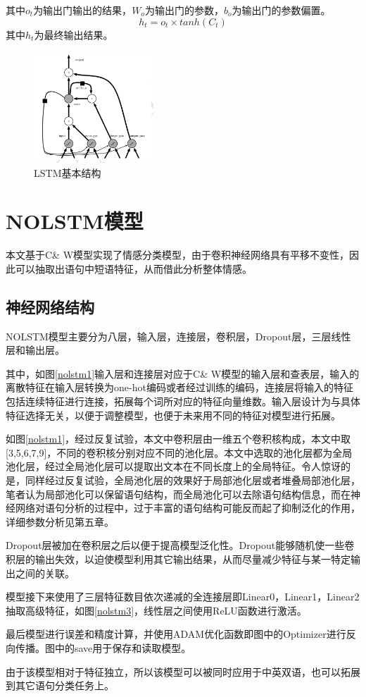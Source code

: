 其中$o_t$为输出门输出的结果，$W_o$为输出门的参数，$b_o$为输出门的参数偏置。
\begin{equation}
h_t = o_t \times tanh{(C_t)}
\end{equation}
其中$h_t$为最终输出结果。
\begin{figure}[!hbp]
\begin{center}
\includegraphics[width=0.4\textwidth]{graphic/lstm1.png}
\caption{LSTM基本结构\cite{deeplearning2016} \label{lstm1}}
\end{center}
\end{figure}

\section{NOLSTM模型}
本文基于C\& W模型实现了情感分类模型，由于卷积神经网络具有平移不变性，因此可以抽取出语句中短语特征，从而借此分析整体情感。
\subsection{神经网络结构}
NOLSTM模型主要分为八层，输入层，连接层，卷积层，Dropout层，三层线性层和输出层。\par
其中，如图\ref{nolstm1}输入层和连接层对应于C\& W模型的输入层和查表层，输入的离散特征在输入层转换为one-hot编码或者经过训练的编码，连接层将输入的特征包括连续特征进行连接，拓展每个词所对应的特征向量维数。输入层设计为与具体特征选择无关，以便于调整模型，也便于未来用不同的特征对模型进行拓展。\par
如图\ref{nolstm1}，经过反复试验，本文中卷积层由一维五个卷积核构成，本文中取[3,5,6,7,9]，不同的卷积核分别对应不同的池化层。本文中选取的池化层都为全局池化层，经过全局池化层可以提取出文本在不同长度上的全局特征。令人惊讶的是，同样经过反复试验，全局池化层的效果好于局部池化层或者堆叠局部池化层，笔者认为局部池化可以保留语句结构，而全局池化可以去除语句结构信息，而在神经网络对语句分析的过程中，过于丰富的语句结构可能反而起了抑制泛化的作用，详细参数分析见第五章。\par
Dropout层被加在卷积层之后以便于提高模型泛化性。Dropout能够随机使一些卷积层的输出失效，以迫使模型利用其它输出结果，从而尽量减少特征与某一特定输出之间的关联。\par
模型接下来使用了三层特征数目依次递减的全连接层即Linear0，Linear1，Linear2抽取高级特征，如图\ref{nolstm3}，线性层之间使用ReLU函数进行激活。\par
最后模型进行误差和精度计算，并使用ADAM优化函数即图中的Optimizer进行反向传播。图中的save用于保存和读取模型。\par
由于该模型相对于特征独立，所以该模型可以被同时应用于中英双语，也可以拓展到其它语句分类任务上。

